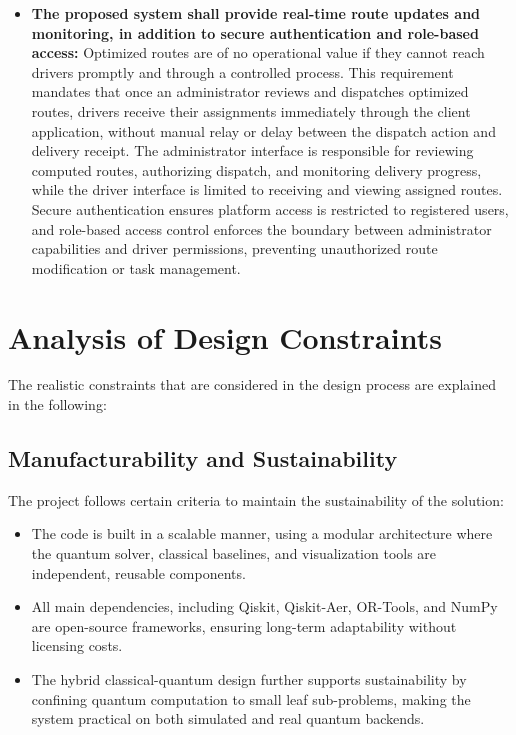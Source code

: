 \documentclass[a4paper]{report}
\begin{document}
{\begin{itemize}
\begin{itemize}
  \item \textbf{The proposed system shall provide real-time route updates and
  monitoring, in addition to secure authentication and role-based access:}
  Optimized routes are of no operational value if they cannot reach drivers
  promptly and through a controlled process. This requirement mandates that
  once an administrator reviews and dispatches optimized routes, drivers receive
  their assignments immediately through the client application, without manual
  relay or delay between the dispatch action and delivery receipt. The
  administrator interface is responsible for reviewing computed routes,
  authorizing dispatch, and monitoring delivery progress, while the driver
  interface is limited to receiving and viewing assigned routes. Secure
  authentication ensures platform access is restricted to registered users,
  and role-based access control enforces the boundary between administrator
  capabilities and driver permissions, preventing unauthorized route modification
  or task management.

  \end{itemize}

\section{Analysis of Design Constraints }
The realistic constraints that are considered in the design process are explained in the following: 

\subsection{Manufacturability and Sustainability}
The project follows certain criteria to maintain the sustainability of the solution:

\begin{itemize}
    \item  The code is built in a scalable manner, using a modular architecture where the quantum solver, classical baselines, and visualization tools are independent, reusable components.
\end{itemize}
\begin{itemize}
    \item All main dependencies, including Qiskit, Qiskit-Aer, OR-Tools, and NumPy are
open-source frameworks, ensuring long-term adaptability without licensing costs.
\end{itemize}
\begin{itemize}
 \item The hybrid classical-quantum design further supports sustainability by confining quantum computation to small leaf sub-problems, making the system practical on
both simulated and real quantum backends.
\end{itemize}



\end{itemize}}
\end{document}
